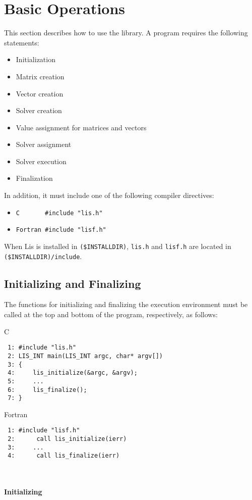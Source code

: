 \documentclass[a4paper]{article}
\begin{document}
\newpage
\section{Basic Operations}
This section describes how to use the library. 
A program requires the following statements:
\begin{itemize}
\item Initialization
\item Matrix creation
\item Vector creation
\item Solver creation
\item Value assignment for matrices and vectors
\item Solver assignment
\item Solver execution
\item Finalization
\end{itemize}
In addition, it must include one of the following compiler directives: 
\begin{itemize}
\item \verb+C       #include "lis.h"+
\item \verb+Fortran #include "lisf.h"+
\end{itemize}
When Lis is installed in \verb|($INSTALLDIR)|, {\tt lis.h} and {\tt lisf.h}
are located in \verb|($INSTALLDIR)/include|.

\subsection{Initializing and Finalizing}
The functions for initializing and finalizing the execution environment 
must be called at the top and bottom of the program, respectively, as follows:
\begin{itemsquarebox}[l]{C}
\small
\begin{verbatim}
 1: #include "lis.h"
 2: LIS_INT main(LIS_INT argc, char* argv[])
 3: {
 4:     lis_initialize(&argc, &argv);
 5:     ...
 6:     lis_finalize();
 7: }
\end{verbatim}
\end{itemsquarebox}
\begin{itemsquarebox}[l]{Fortran}
\small
\begin{verbatim}
 1: #include "lisf.h"
 2:      call lis_initialize(ierr) 
 3:     ...
 4:      call lis_finalize(ierr)
\end{verbatim}
\end{itemsquarebox}
\\ \\
\noindent
{\bf Initializing}
\end{document}

